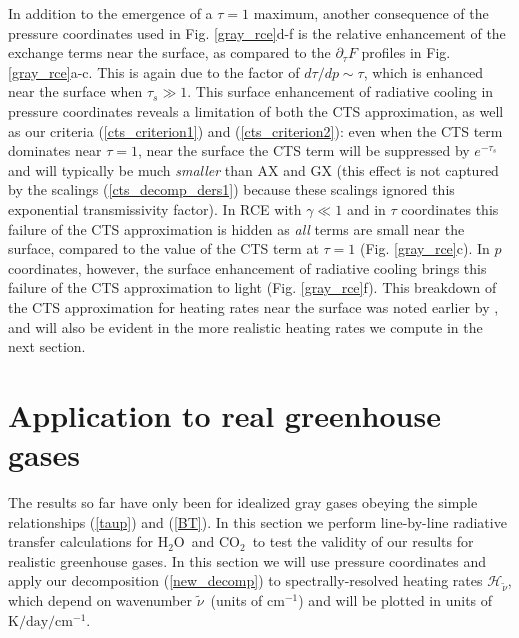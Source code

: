 \documentclass{ametsoc}
\newcommand{\eqnref}[1]{(\ref{#1})}
\newcommand{\Kelvin}{\ensuremath{\mathrm{K}}}
\newcommand{\cminverse}{\ensuremath{\mathrm{cm^{-1}}}}
\newcommand{\pptau}{\ensuremath{\partial_\tau}}
\newcommand{\cotwo}{\ensuremath{\mathrm{CO_2}}}
\newcommand{\htwo}{\ensuremath{\mathrm{H_2O}}}
\newcommand{\wv}{\ensuremath{\widetilde{\nu}}}
\newcommand{\ch}{\ensuremath{\mathcal{H}}}
\newcommand{\chk}{\ensuremath{\ch_\wv}}
\newcommand{\taus}{\ensuremath{\tau_s}}
\begin{document}
In addition to the emergence of a $\tau=1$ maximum, another consequence of the pressure coordinates used in  Fig. \ref{gray_rce}d-f is the relative enhancement of the exchange terms near the surface, as compared  to the $\pptau F$ profiles in Fig. \ref{gray_rce}a-c. This is again due to the factor of $d \tau/dp\sim \tau$, which is enhanced near the surface when $\taus \gg 1$. This surface enhancement of radiative cooling in pressure coordinates reveals a limitation of both the CTS approximation, as well as our criteria \eqnref{cts_criterion1} and \eqnref{cts_criterion2}: even when the CTS term dominates near $\tau= 1$, near the surface the CTS term will be suppressed by $e^{-\taus}$ and will typically be much \emph{smaller} than AX and GX (this effect is not captured by the scalings \eqnref{cts_decomp_ders1} because these scalings ignored this exponential transmissivity factor).  In RCE with $\gamma \ll 1$ and in $\tau$ coordinates this failure of the CTS approximation is hidden as \emph{all}  terms are small near the surface, compared to the value of the CTS term at $\tau=1$ (Fig. \ref{gray_rce}c). In $p$ coordinates, however, the surface enhancement of radiative cooling  brings this failure of the CTS approximation to light (Fig. \ref{gray_rce}f). This breakdown of the CTS approximation for heating rates near the surface was noted earlier by \cite{joseph1976}, and will also be evident in the more realistic heating rates we compute in the next section.

\section{Application to real greenhouse gases} \label{sec_rfm_calcs}
The results so far have only been for idealized gray gases obeying the simple relationships \eqnref{taup} and \eqnref{BT}. In this section we perform line-by-line radiative transfer calculations for \htwo\ and \cotwo\ to test the validity of our results for realistic greenhouse gases. In this section we will use pressure coordinates and apply our decomposition \eqnref{new_decomp} to spectrally-resolved heating rates \chk, which depend on wavenumber \wv\ (units of \cminverse) and will be plotted in  units of $\Kelvin/\mathrm{day}/\cminverse$.
\end{document}
